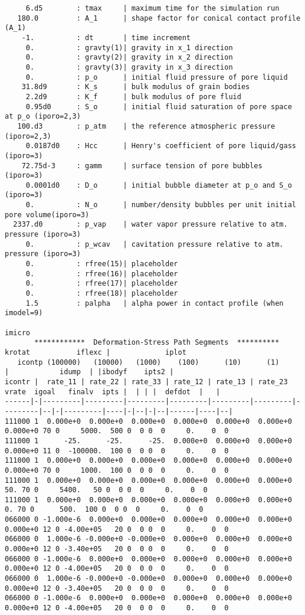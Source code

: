 \begin{verbatim}
     6.d5        : tmax     | maximum time for the simulation run
   180.0         : A_1      | shape factor for conical contact profile (A_1)
    -1.          : dt       | time increment
     0.          : gravty(1)| gravity in x_1 direction
     0.          : gravty(2)| gravity in x_2 direction
     0.          : gravty(3)| gravity in x_3 direction
     0.          : p_o      | initial fluid pressure of pore liquid
    31.8d9       : K_s      | bulk modulus of grain bodies
     2.2d9       : K_f      | bulk modulus of pore fluid
     0.95d0      : S_o      | initial fluid saturation of pore space at p_o (iporo=2,3)
   100.d3        : p_atm    | the reference atmospheric pressure (iporo=2,3)
     0.0187d0    : Hcc      | Henry's coefficient of pore liquid/gass (iporo=3)
    72.75d-3     : gamm     | surface tension of pore bubbles (iporo=3)
     0.0001d0    : D_o      | initial bubble diameter at p_o and S_o (iporo=3)
     0.          : N_o      | number/density bubbles per unit initial pore volume(iporo=3)
  2337.d0        : p_vap    | water vapor pressure relative to atm. pressure (iporo=3)
     0.          : p_wcav   | cavitation pressure relative to atm. pressure (iporo=3)
     0.          : rfree(15)| placeholder
     0.          : rfree(16)| placeholder
     0.          : rfree(17)| placeholder
     0.          : rfree(18)| placeholder
     1.5         : palpha   | alpha power in contact profile (when imodel=9)
                                                                                                   imicro
       ************  Deformation-Stress Path Segments  **********             krotat           iflexc |             iplot
   icontp (100000)   (10000)   (1000)    (100)      (10)      (1)                 |            idump  | |ibodyf    ipts2 |
icontr |  rate_11 | rate_22 | rate_33 | rate_12 | rate_13 | rate_23    vrate  igoal   finalv  ipts |  | | |  defdot  |   |
------|-|---------|---------|---------|---------|---------|---------|---------|--|-|---------|----|-|--|-|--|------|----|--|
111000 1  0.000e+0  0.000e+0  0.000e+0  0.000e+0  0.000e+0  0.000e+0  0.000e+0 70 0     5000.  500 0  0 0  0     0.    0  0
111000 1      -25.      -25.      -25.  0.000e+0  0.000e+0  0.000e+0  0.000e+0 11 0  -100000.  100 0  0 0  0     0.    0  0
111000 1  0.000e+0  0.000e+0  0.000e+0  0.000e+0  0.000e+0  0.000e+0  0.000e+0 70 0     1000.  100 0  0 0  0     0.    0  0
111000 1  0.000e+0  0.000e+0  0.000e+0  0.000e+0  0.000e+0  0.000e+0       50. 70 0     5400.   50 0  0 0  0     0.    0  0
111000 1  0.000e+0  0.000e+0  0.000e+0  0.000e+0  0.000e+0  0.000e+0        0. 70 0      500.  100 0  0 0  0     0.    0  0
066000 0 -1.000e-6  0.000e+0  0.000e+0  0.000e+0  0.000e+0  0.000e+0  0.000e+0 12 0 -4.00e+05   20 0  0 0  0     0.    0  0
066000 0  1.000e-6 -0.000e+0 -0.000e+0  0.000e+0  0.000e+0  0.000e+0  0.000e+0 12 0 -3.40e+05   20 0  0 0  0     0.    0  0
066000 0 -1.000e-6  0.000e+0  0.000e+0  0.000e+0  0.000e+0  0.000e+0  0.000e+0 12 0 -4.00e+05   20 0  0 0  0     0.    0  0
066000 0  1.000e-6 -0.000e+0 -0.000e+0  0.000e+0  0.000e+0  0.000e+0  0.000e+0 12 0 -3.40e+05   20 0  0 0  0     0.    0  0
066000 0 -1.000e-6  0.000e+0  0.000e+0  0.000e+0  0.000e+0  0.000e+0  0.000e+0 12 0 -4.00e+05   20 0  0 0  0     0.    0  0
\end{verbatim}

